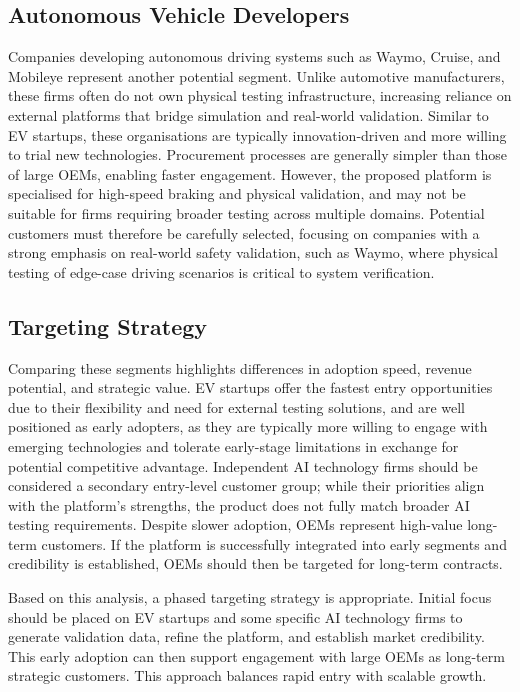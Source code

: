 \documentclass[11pt, a4paper]{report}
\numberwithin{equation}{section}
\begin{document}
\begin{refsection}
\subsection{Autonomous Vehicle Developers}

Companies developing autonomous driving systems such as Waymo, Cruise, and Mobileye represent another potential segment. Unlike automotive manufacturers, these firms often do not own physical testing infrastructure, increasing reliance on external platforms that bridge simulation and real-world validation. Similar to EV startups, these organisations are typically innovation-driven and more willing to trial new technologies. Procurement processes are generally simpler than those of large OEMs, enabling faster engagement. However, the proposed platform is specialised for high-speed braking and physical validation, and may not be suitable for firms requiring broader testing across multiple domains. Potential customers must therefore be carefully selected, focusing on companies with a strong emphasis on real-world safety validation, such as Waymo, where physical testing of edge-case driving scenarios is critical to system verification.

\subsection{Targeting Strategy}

Comparing these segments highlights differences in adoption speed, revenue potential, and strategic value. EV startups offer the fastest entry opportunities due to their flexibility and need for external testing solutions, and are well positioned as early adopters, as they are typically more willing to engage with emerging technologies and tolerate early-stage limitations in exchange for potential competitive advantage. Independent AI technology firms should be considered a secondary entry-level customer group; while their priorities align with the platform’s strengths, the product does not fully match broader AI testing requirements. Despite slower adoption, OEMs represent high-value long-term customers. If the platform is successfully integrated into early segments and credibility is established, OEMs should then be targeted for long-term contracts.

Based on this analysis, a phased targeting strategy is appropriate. Initial focus should be placed on EV startups and some specific AI technology firms to generate validation data, refine the platform, and establish market credibility. This early adoption can then support engagement with large OEMs as long-term strategic customers. This approach balances rapid entry with scalable growth.


\end{refsection}
\end{document}
